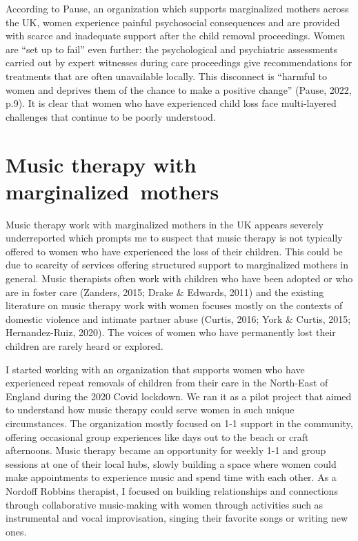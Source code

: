 \documentclass[authordate, empirical]{jote-new-article}
\begin{document}
	According to Pause, an organization which supports marginalized mothers across the UK, women experience painful psychosocial consequences and are provided with scarce and inadequate support after the child removal proceedings. Women are “set up to fail” even further: the psychological and psychiatric assessments carried out by expert witnesses during care proceedings give recommendations for treatments that are often unavailable locally. This disconnect is “harmful to women and deprives them of the chance to make a positive change” (Pause, 2022, p.9). It is clear that women who have experienced child loss face multi-layered challenges that continue to be poorly understood.







	\section{Music therapy with \mbox{marginalized mothers}}







	Music therapy work with marginalized mothers in the UK appears severely underreported which prompts me to suspect that music therapy is not typically offered to women who have experienced the loss of their children. This could be due to scarcity of services offering structured support to marginalized mothers in general. Music therapists often work with children who have been adopted or who are in foster care (Zanders, 2015; Drake \& Edwards, 2011) and the existing literature on music therapy work with women focuses mostly on the contexts of domestic violence and intimate partner abuse (Curtis, 2016; York \& Curtis, 2015; Hernandez-Ruiz, 2020). The voices of women who have permanently lost their children are rarely heard or explored.







	I started working with an organization that supports women who have experienced repeat removals of children from their care in the North-East of England during the 2020 Covid lockdown. We ran it as a pilot project that aimed to understand how music therapy could serve women in such unique circumstances. The organization mostly focused on 1-1 support in the community, offering occasional group experiences like days out to the beach or craft afternoons. Music therapy became an opportunity for weekly 1-1 and group sessions at one of their local hubs, slowly building a space where women could make appointments to experience music and spend time with each other. As a Nordoff Robbins therapist, I focused on building relationships and connections through collaborative music-making with women through activities such as instrumental and vocal improvisation, singing their favorite songs or writing new ones.
\end{document}
